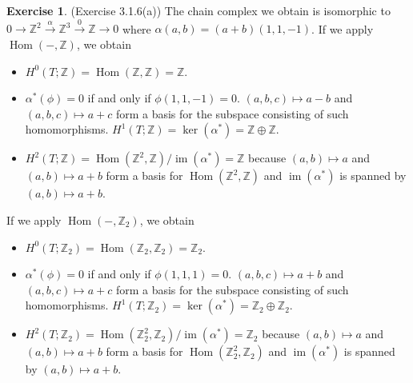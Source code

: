 \documentclass[12pt, psamsfonts]{amsart}
\theoremstyle{definition}
\newtheorem*{exer}{Exercise}
\theoremstyle{remark}
\DeclareMathOperator{\Hom}{Hom}
\DeclareMathOperator{\im}{im}
\numberwithin{equation}{section}
\begin{document}
\begin{exer}{(Exercise 3.1.6(a))}
  The chain complex we obtain is isomorphic to $0 \rightarrow \mathbb{Z}^2 \xrightarrow{\alpha} \mathbb{Z}^3 \xrightarrow{0} \mathbb{Z} \rightarrow 0$ where $\alpha(a, b) = (a + b)(1, 1, -1)$.
  If we apply $\Hom(-, \mathbb{Z})$, we obtain
  \begin{itemize}
    \item
      $H^0(T; \mathbb{Z}) = \Hom(\mathbb{Z}, \mathbb{Z}) = \mathbb{Z}$.
    \item
      $\alpha^{\ast}(\phi) = 0$ if and only if $\phi(1, 1, -1) = 0$.
      $(a, b, c) \mapsto a - b$ and $(a, b, c) \mapsto a + c$ form a basis for the subspace consisting of such homomorphisms.
      $H^1(T; \mathbb{Z}) = \ker(\alpha^{\ast}) = \mathbb{Z} \oplus \mathbb{Z}$.
    \item
      $H^2(T; \mathbb{Z}) = \Hom(\mathbb{Z}^2, \mathbb{Z}) / \im(\alpha^{\ast}) = \mathbb{Z}$ because $(a, b) \mapsto a$ and $(a, b) \mapsto a + b$ form a basis for $\Hom(\mathbb{Z}^2, \mathbb{Z})$ and $\im(\alpha^{\ast})$ is spanned by $(a, b) \mapsto a + b$.
  \end{itemize}
  If we apply $\Hom(-, \mathbb{Z}_2)$, we obtain
  \begin{itemize}
    \item
      $H^0(T; \mathbb{Z}_2) = \Hom(\mathbb{Z}_2, \mathbb{Z}_2) = \mathbb{Z}_2$.
    \item
      $\alpha^{\ast}(\phi) = 0$ if and only if $\phi(1, 1, 1) = 0$.
      $(a, b, c) \mapsto a + b$ and $(a, b, c) \mapsto a + c$ form a basis for the subspace consisting of such homomorphisms.
      $H^1(T; \mathbb{Z}_2) = \ker(\alpha^{\ast}) = \mathbb{Z}_2 \oplus \mathbb{Z}_2$.
    \item
      $H^2(T; \mathbb{Z}_2) = \Hom(\mathbb{Z}_2^2, \mathbb{Z}_2) / \im(\alpha^{\ast}) = \mathbb{Z}_2$ because $(a, b) \mapsto a$ and $(a, b) \mapsto a + b$ form a basis for $\Hom(\mathbb{Z}_2^2, \mathbb{Z}_2)$ and $\im(\alpha^{\ast})$ is spanned by $(a, b) \mapsto a + b$.
  \end{itemize}
\end{exer}
\end{document}
